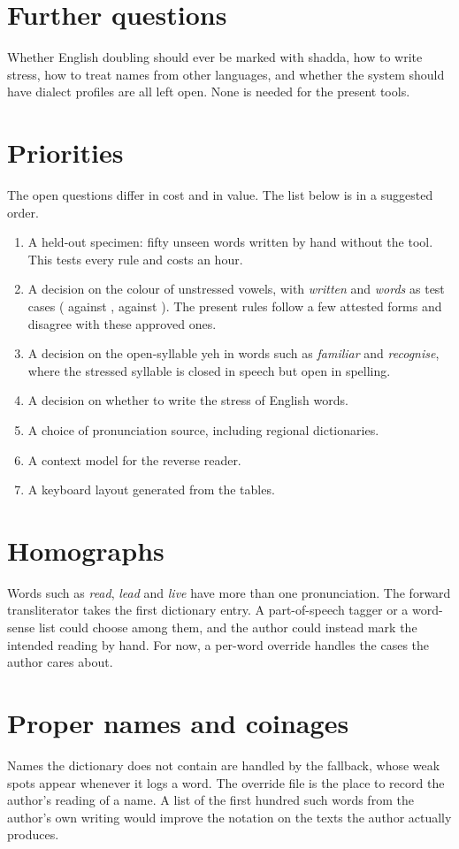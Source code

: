 \section{Further questions}
Whether English doubling should ever be marked with shadda, how to write stress, how to treat names from other languages, and whether the system should have dialect profiles are all left open. None is needed for the present tools.

\section{Priorities}
The open questions differ in cost and in value. The list below is in a suggested order.
\begin{enumerate}
\item A held-out specimen: fifty unseen words written by hand without the tool. This tests every rule and costs an hour.
\item A decision on the colour of unstressed vowels, with \emph{written} and \emph{words} as test cases ( against ,  against ). The present rules follow a few attested forms and disagree with these approved ones.
\item A decision on the open-syllable yeh in words such as \emph{familiar} and \emph{recognise}, where the stressed syllable is closed in speech but open in spelling.
\item A decision on whether to write the stress of English words.
\item A choice of pronunciation source, including regional dictionaries.
\item A context model for the reverse reader.
\item A keyboard layout generated from the tables.
\end{enumerate}

\section{Homographs}
Words such as \emph{read}, \emph{lead} and \emph{live} have more than one pronunciation. The forward transliterator takes the first dictionary entry. A part-of-speech tagger or a word-sense list could choose among them, and the author could instead mark the intended reading by hand. For now, a per-word override handles the cases the author cares about.

\section{Proper names and coinages}
Names the dictionary does not contain are handled by the fallback, whose weak spots appear whenever it logs a word. The override file is the place to record the author's reading of a name. A list of the first hundred such words from the author's own writing would improve the notation on the texts the author actually produces.

